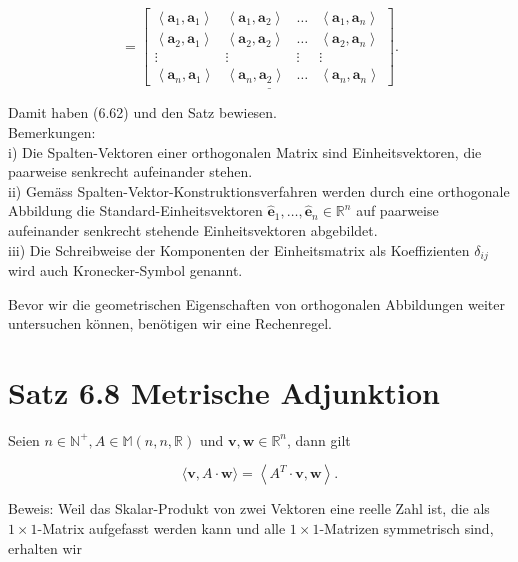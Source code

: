 \documentclass[10pt]{article}
\begin{document}
\[
=\underline{\left[\begin{array}{cccc}
\left\langle\mathbf{a}_{1}, \mathbf{a}_{1}\right\rangle & \left\langle\mathbf{a}_{1}, \mathbf{a}_{2}\right\rangle & \ldots & \left\langle\mathbf{a}_{1}, \mathbf{a}_{n}\right\rangle  \tag{6.63}\\
\left\langle\mathbf{a}_{2}, \mathbf{a}_{1}\right\rangle & \left\langle\mathbf{a}_{2}, \mathbf{a}_{2}\right\rangle & \ldots & \left\langle\mathbf{a}_{2}, \mathbf{a}_{n}\right\rangle \\
\vdots & \vdots & \vdots & \vdots \\
\left\langle\mathbf{a}_{n}, \mathbf{a}_{1}\right\rangle & \left\langle\mathbf{a}_{n}, \mathbf{a}_{2}\right\rangle & \ldots & \left\langle\mathbf{a}_{n}, \mathbf{a}_{n}\right\rangle
\end{array}\right] .}
\]

Damit haben (6.62) und den Satz bewiesen.\\
Bemerkungen:\\
i) Die Spalten-Vektoren einer orthogonalen Matrix sind Einheitsvektoren, die paarweise senkrecht aufeinander stehen.\\
ii) Gemäss Spalten-Vektor-Konstruktionsverfahren werden durch eine orthogonale Abbildung die Standard-Einheitsvektoren $\hat{\mathbf{e}}_{1}, \ldots, \hat{\mathbf{e}}_{n} \in \mathbb{R}^{n}$ auf paarweise aufeinander senkrecht stehende Einheitsvektoren abgebildet.\\
iii) Die Schreibweise der Komponenten der Einheitsmatrix als Koeffizienten $\delta_{i j}$ wird auch Kronecker-Symbol genannt.

Bevor wir die geometrischen Eigenschaften von orthogonalen Abbildungen weiter untersuchen können, benötigen wir eine Rechenregel.

\section*{Satz 6.8 Metrische Adjunktion}
Seien $n \in \mathbb{N}^{+}, A \in \mathbb{M}(n, n, \mathbb{R})$ und $\mathbf{v}, \mathbf{w} \in \mathbb{R}^{n}$, dann gilt


\begin{equation*}
\langle\mathbf{v}, A \cdot \mathbf{w}\rangle=\left\langle A^{T} \cdot \mathbf{v}, \mathbf{w}\right\rangle . \tag{6.64}
\end{equation*}


Beweis: Weil das Skalar-Produkt von zwei Vektoren eine reelle Zahl ist, die als $1 \times 1$-Matrix aufgefasst werden kann und alle $1 \times 1$-Matrizen symmetrisch sind, erhalten wir
\end{document}
